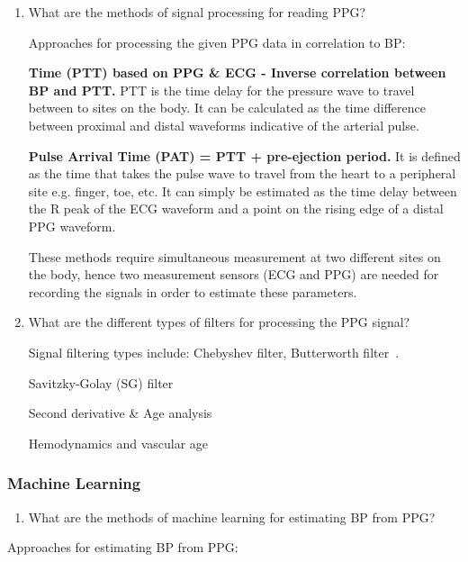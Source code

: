 \documentclass[12pt, bibliography=totoc]{scrartcl}
\begin{document}
\begin{enumerate}
\item What are the methods of signal processing for reading PPG?

Approaches for processing the given PPG data in correlation to BP:\newline

\textbf{Time (PTT) based on  PPG \& ECG - Inverse correlation between BP and PTT.} PTT is the time delay for the pressure wave to travel between to sites on the body. It can be calculated as the time difference between proximal and distal waveforms indicative of the arterial pulse.

\textbf{Pulse Arrival Time (PAT) = PTT + pre-ejection period.} It is defined as the time that takes the pulse wave to travel from the heart to a peripheral site e.g. finger, toe, etc. It can simply be estimated as the time delay between the R peak of the ECG waveform and a point on the rising edge of a distal PPG waveform.

These methods require simultaneous measurement at two different sites on the body, hence two measurement sensors (ECG and PPG) are needed for recording the signals in order to estimate these parameters.

\item What are the different types of filters for processing the PPG signal? 

Signal filtering types include: Chebyshev filter, Butterworth filter~\cite{liangOptimalFilterShort2018}.

Savitzky-Golay (SG) filter \cite{savitzkySmoothingDifferentiationData1964}

Second derivative \& Age analysis \cite{takazawaAssessmentVasoactiveAgents1998a}

Hemodynamics and vascular age \cite{charltonAssessingHemodynamicsPhotoplethysmogram2022}

\end{enumerate}

\subsubsection{Machine Learning}

\begin{enumerate}
\item What are the methods of machine learning for estimating BP from PPG?
\end{enumerate}

Approaches for estimating BP from PPG: \newline
\end{document}
